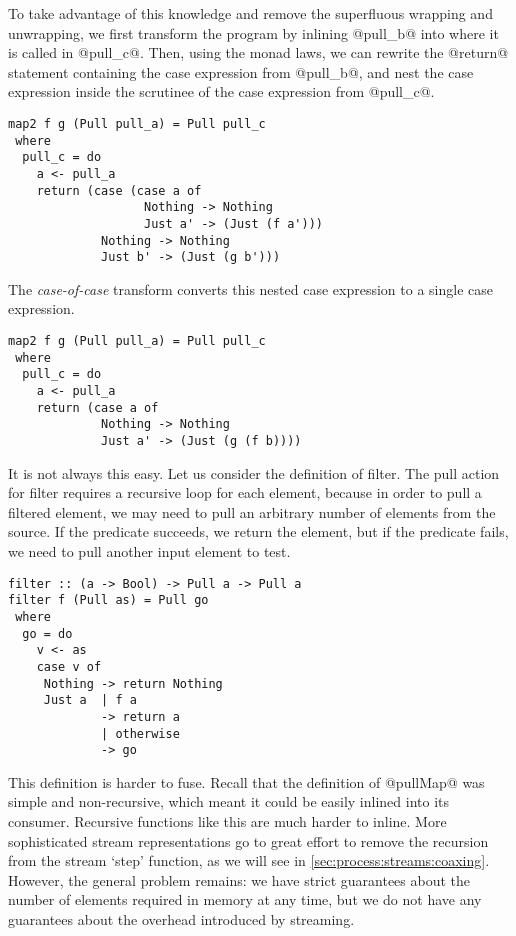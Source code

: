To take advantage of this knowledge and remove the superfluous wrapping and unwrapping, we first transform the program by inlining @pull_b@ into where it is called in @pull_c@.
Then, using the monad laws, we can rewrite the @return@ statement containing the case expression from @pull_b@, and nest the case expression inside the scrutinee of the case expression from @pull_c@.

\begin{lstlisting}
map2 f g (Pull pull_a) = Pull pull_c
 where
  pull_c = do
    a <- pull_a
    return (case (case a of
                   Nothing -> Nothing
                   Just a' -> (Just (f a')))
             Nothing -> Nothing
             Just b' -> (Just (g b')))
\end{lstlisting}

The \emph{case-of-case} transform converts this nested case expression to a single case expression.


\begin{lstlisting}
map2 f g (Pull pull_a) = Pull pull_c
 where
  pull_c = do
    a <- pull_a
    return (case a of
             Nothing -> Nothing
             Just a' -> (Just (g (f b))))
\end{lstlisting}

It is not always this easy.
Let us consider the definition of filter.
The pull action for filter requires a recursive loop for each element, because in order to pull a filtered element, we may need to pull an arbitrary number of elements from the source.
If the predicate succeeds, we return the element, but if the predicate fails, we need to pull another input element to test.

\begin{lstlisting}
filter :: (a -> Bool) -> Pull a -> Pull a
filter f (Pull as) = Pull go
 where
  go = do
    v <- as
    case v of
     Nothing -> return Nothing
     Just a  | f a
             -> return a
             | otherwise
             -> go
\end{lstlisting}

This definition is harder to fuse. Recall that the definition of @pullMap@ was simple and non-recursive, which meant it could be easily inlined into its consumer.
Recursive functions like this are much harder to inline.
More sophisticated stream representations go to great effort to remove the recursion from the stream `step' function, as we will see in \autoref{sec:process:streams:coaxing}.
However, the general problem remains: we have strict guarantees about the number of elements required in memory at any time, but we do not have any guarantees about the overhead introduced by streaming.

